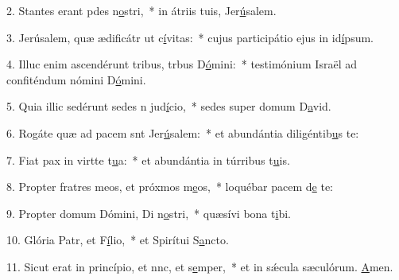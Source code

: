 2. Stantes erant pdes n\uline{o}stri,~* in átriis tuis, Jer\uline{ú}salem.\par 
3. Jerúsalem, quæ ædificátr ut c\uline{í}vitas:~* cujus participátio ejus in id\uline{í}psum.\par 
4. Illuc enim ascendérunt tribus, trbus D\uline{ó}mini:~* testimónium Israël ad confiténdum nómini D\uline{ó}mini.\par 
5. Quia illic sedérunt sedes n jud\uline{í}cio,~* sedes super domum D\uline{a}vid.\par 
6. Rogáte quæ ad pacem snt Jer\uline{ú}salem:~* et abundántia diligéntib\uline{u}s te:\par 
7. Fiat pax in virtte t\uline{u}a:~* et abundántia in túrribus t\uline{u}is.\par 
8. Propter fratres meos, et próxmos m\uline{e}os,~* loquébar pacem d\uline{e} te:\par 
9. Propter domum Dómini, Di n\uline{o}stri,~* quæsívi bona t\uline{i}bi.\par 
10. Glória Patr, et F\uline{í}lio,~* et Spirítui S\uline{a}ncto.\par 
11. Sicut erat in princípio, et nnc, et s\uline{e}mper,~* et in sǽcula sæculórum. \uline{A}men.\par 
